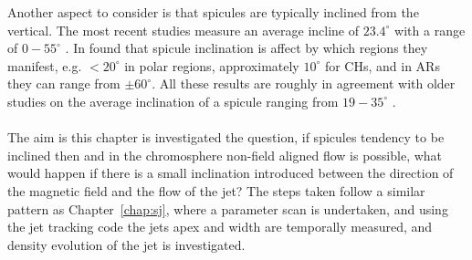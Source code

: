 \documentclass[12pt]{ociamthesis}
\newcommand{\np}{\\ \\}
\newcommand{\degs}{^{\circ}}
\begin{document}
%
Another aspect to consider is that spicules are typically inclined from the vertical. The most recent studies measure an average incline of $23.4\degs$ with a range of $0-55\degs$ \citep{Pasachoff2009SoPh26059P}. In \cite{Tavabi2012JMPh31786T} found that spicule inclination is affect by which regions they manifest, e.g. $<20\degs$ in polar regions, approximately $10\degs$ for CHs, and in ARs they can range from $\pm 60\degs$. All these results are roughly in agreement with older studies on the average inclination of a spicule ranging from $19-35 \degs$ \citep{Beckers1968, Mosher1977SoPh53375M, Heristchi1992SoPh14221H, Tsiropoula2012}. \np
%
The aim is this chapter is investigated the question, if spicules tendency to be inclined then and in the chromosphere non-field aligned flow is possible, what would happen if there is a small inclination introduced between the direction of the magnetic field and the flow of the jet? The steps taken follow a similar pattern as Chapter~\ref{chap:sj}, where a parameter scan is undertaken, and using the jet tracking code the jets apex and width are temporally measured, and density evolution of the jet is investigated. 
\end{document}
